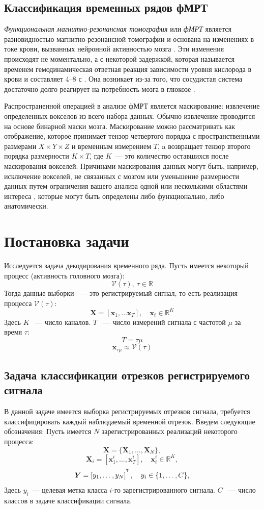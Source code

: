\documentclass[a4paper, 12pt]{extarticle}
\begin{document}
\subsection*{Классификация временных рядов фМРТ}
\textit{Функциональная магнитно-резонансная томография} или \textit{фМРТ}
является разновидностью магнитно-резонансной томографии и основана на изменениях в токе крови,
вызванных нейронной активностью мозга \citep{Glover2011}.
Эти изменения происходят не моментально, а с некоторой задержкой,
которая называется временем гемодинамическая ответная реакция зависимости уровня кислорода в крови и составляет 4--8 с \citep{Bandettini1992}.
Она возникает из-за того, что сосудистая система достаточно долго реагирует на потребность мозга в глюкозе 
\citep{Logothetis2003}. 

Распространенной операцией в анализе фМРТ является маскирование: 
извлечение определенных вокселов из всего набора данных.
Обычно извлечение проводится на основе бинарной маски мозга. 
Маскирование можно рассматривать как отображение, 
которое принимает тензор четвертого порядка с пространственными размерами $X \times Y \times Z$ и временным измерением $T$, a 
возвращает тензор второго порядка размерности $K \times T$, где $K$~--- это количество оставшихся после маскирования вокселей.
Причинами маскирования данных могут быть, например, исключение вокселей, не связанных с мозгом 
или уменьшение размерности данных путем ограничения вашего анализа одной или несколькими областями интереса \citep{poldrack2007region}, 
которые могут быть определены либо функционально, либо анатомически.


\section{Постановка задачи}
Исследуется задача декодирования временного ряда. Пусть имеется некоторый процесс (активность головного мозга):
$$\mathcal{V}(\tau),~\tau \in \mathbb{R}$$
Тогда данные выборки ~--- это регистрируемый сигнал, то есть реализация процесса $\mathcal{V}(\tau)$:
$$\bm{X} = \left[\bm{x}_1,\dots \bm{x}_{T}\right], \quad \bm{x}_t \in \mathbb{R}^K$$
Здесь $K$ ~--- число каналов. $T$ ~--- число измерений сигнала с частотой $\mu$ за время $\tau$:
$$T = \tau \mu$$
$$\bm{x}_{\tau \mu} \approx \mathcal{V}(\tau)$$
\subsection{Задача классификации отрезков регистрируемого сигнала}
В данной задаче имеется выборка регистрируемых отрезков сигнала, 
требуется классифицировать каждый наблюдаемый временной отрезок. 
Введем следующие обозначения:
Пусть имеется $N$ зарегистрированных реализаций некоторого процесса:
$$\bm{X} = \{\bm{X}_1,\dots, \bm{X}_N\},$$
$$\bm{X}_i = \left[\bm{x}^i_1,\dots, \bm{x}^i_{T}\right], \quad \bm{x}^i_t \in \mathbb{R}^K,$$
$$\bm{Y} = \left[y_1, \dots, y_{N}\right]^{^{\mathsf{T}}}, \quad y_i \in \{1,\dots, C\},$$
Здесь $y_i$~--- целевая метка класса $i$-го зарегистрированного сигнала. $C$ ~--- число классов в задаче классификации сигнала. 
\end{document}
